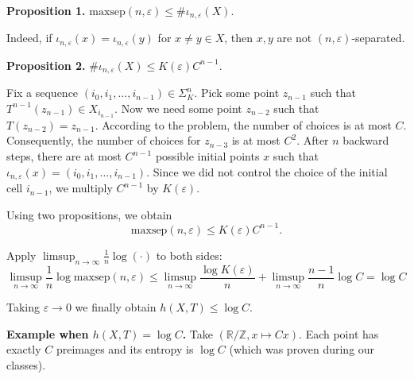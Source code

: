 \documentclass{template}
\begin{document}
\textbf{Proposition 1.} $\text{maxsep}(n,\varepsilon) \leq \#\iota_{n,\varepsilon}(X)$.

Indeed, if $\iota_{n,\varepsilon}(x) = \iota_{n,\varepsilon}(y)$ for $x \neq y \in X$, then $x,y$ are not $(n,\varepsilon)$-separated.

\textbf{Proposition 2.} $\#\iota_{n,\varepsilon}(X) \leq K(\varepsilon)C^{n-1}$.

Fix a sequence $(i_0,i_1,\dots,i_{n-1}) \in \Sigma_K^n$. Pick some point
$z_{n-1}$ such that $T^{n-1}(z_{n-1}) \in X_{i_{n-1}}$. Now we need some point
$z_{n-2}$ such that $T(z_{n-2}) = z_{n-1}$. According to the problem, the number
of choices is at most $C$. Consequently, the number of choices for $z_{n-3}$ is
at most $C^2$. After $n$ backward steps, there are at most $C^{n-1}$ possible
initial points $x$ such that $\iota_{n,\varepsilon}(x) =
(i_0,i_1,\dots,i_{n-1})$. Since we did not control the choice of the initial cell $i_{n-1}$,
we multiply $C^{n-1}$ by $K(\varepsilon)$. 

Using two propositions, we obtain
\begin{equation*}
    \text{maxsep}(n,\varepsilon) \leq K(\varepsilon)C^{n-1}.
\end{equation*}

Apply $\limsup_{n \to \infty}\frac{1}{n}\log(\cdot)$ to both sides:
\begin{equation*}
    \limsup_{n \to \infty}\frac{1}{n}\log\text{maxsep}(n,\varepsilon) \leq \limsup_{n \to \infty}\frac{\log K(\varepsilon)}{n} + \limsup_{n \to \infty}\frac{n-1}{n}\log C = \log C
\end{equation*}

Taking $\varepsilon \to 0$ we finally obtain $h(X,T) \leq \log C$.

\textbf{Example when $h(X,T)=\log C$.} Take $(\mathbb{R}/\mathbb{Z}, x \mapsto
Cx)$. Each point has exactly $C$ preimages and its entropy is $\log C$ (which
was proven during our classes).

\nocite{*}
\renewcommand{\refname}{}


\end{document}

